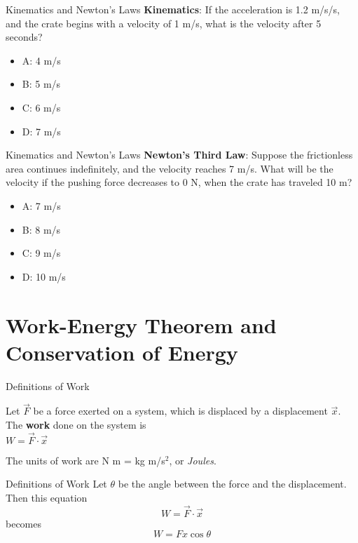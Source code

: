 \documentclass{beamer}
\begin{document}
\begin{frame}{Kinematics and Newton's Laws}
\textbf{Kinematics}: If the acceleration is 1.2 m/s/s, and the crate begins with a velocity of 1 m/s, what is the velocity after 5 seconds?
\begin{itemize}
\item A: 4 m/s
\item B: 5 m/s
\item C: 6 m/s
\item D: 7 m/s
\end{itemize}
\end{frame}

\begin{frame}{Kinematics and Newton's Laws}
\textbf{Newton's Third Law}: Suppose the frictionless area continues indefinitely, and the velocity reaches 7 m/s.  What will be the velocity if the pushing force decreases to 0 N, when the crate has traveled 10 m?
\begin{itemize}
\item A: 7 m/s
\item B: 8 m/s
\item C: 9 m/s
\item D: 10 m/s
\end{itemize}
\end{frame}

\section{Work-Energy Theorem and Conservation of Energy}

\begin{frame}{Definitions of Work}
\begin{tcolorbox}[colback=white,colframe=red!40!blue,title=Physical Definition of Work]
\alert{Let $\vec{F}$ be a force exerted on a system, which is displaced by a displacement $\vec{x}$.  The \textbf{work} done on the system is} \\
\alert{$W = \vec{F} \cdot \vec{x}$} \\
\end{tcolorbox}
The units of work are N m = kg m/s$^2$, or \textit{Joules}. \\
\end{frame}

\begin{frame}{Definitions of Work}
Let $\theta$ be the angle between the force and the displacement.  Then this equation
\begin{equation}
W = \vec{F} \cdot \vec{x}
\end{equation}
becomes
\begin{equation}
W = Fx\cos\theta
\end{equation}
\end{frame}
\end{document}
